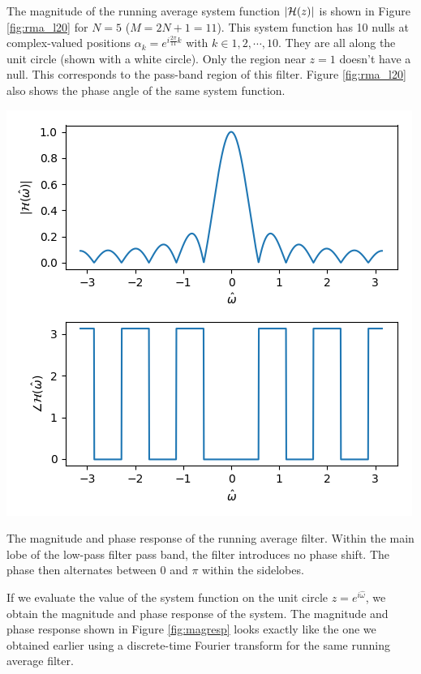 The magnitude of the running average system function $|\mathcal{H}(z)|$ is shown
in Figure \ref{fig:rma_l20} for $N=5$ ($M=2N+1 = 11$). This system
function has 10 nulls at complex-valued positions
$\alpha_k=e^{i\frac{2\pi}{11}k}$ with $k\in {1,2,\cdots,10}$. They are
all along the unit circle (shown with a white circle). Only the region
near $z=1$ doesn't have a null. This corresponds to the pass-band
region of this filter. Figure \ref{fig:rma_l20} also shows the phase
angle of the same system function.
\begin{marginfigure}
  \begin{center}
    \includegraphics[width=\textwidth]{code/025_system_function/rma_magresp.png}
  \end{center}
  \caption{The magnitude and phase response of the running average
    filter. Within the main lobe of the low-pass filter pass band, the
    filter introduces no phase shift. The phase then alternates between
    0 and $\pi$ within the sidelobes.}
  \label{fig:magresp}
\end{marginfigure}

If we evaluate the value of the system function on the unit circle
$z=e^{i\hat{\omega}}$, we obtain the magnitude and phase response of
the system. The magnitude and phase response shown in Figure
\ref{fig:magresp} looks exactly like the one we obtained earlier using
a discrete-time Fourier transform for the same running average filter.

